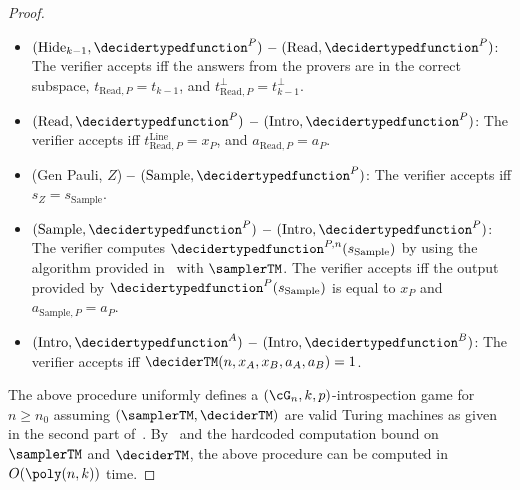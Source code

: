 \begin{proof}
\begin{itemize}
\begin{align*}
		\end{align*}
		and use a similar computation step to compute the description for $\ker{\left(\decidertypedfunction^{P, n}_{i+1,t_{< i +1}^{\text{Line}} }\right)}$ and $\ker{\left(\decidertypedfunction^{P, n}_{i+1,t_{< i +1}^{\text{Line}} }\right)}^{\bot}$. Then the verifier parse
		\begin{align*}
			r_{> i } &= 	\bar{r}_{i} + \bar{r}_{i}^{\bot} + \bar{r}_{>i+1} \in \ker{\left(\decidertypedfunction^{P, n}_{i+1,t_{< i +1}^{\text{Line}} }\right)} \oplus  \ker{\left(\decidertypedfunction^{P,n}_{i+1,t_{< i +1}^{\text{Line}} }\right)}^{\bot}  \oplus V_{> i+1}^n, 
		\end{align*}
		The verifier accepts iff the answers from the provers are in the correct subspace 
		\begin{align*}
			\tilde{t}_{\leq i }^{\bot} = t_{\leq i }^{\bot},\quad  \bar{r}_{i}^{\bot} = \tilde{t}_{i +1 }^{\bot}, \quad \tilde{t}_{< i }^{\text{Line}} = \tilde{t}_{< i }^{\text{Line}}, \quad \bar{r}_{>i+1} = r_{>i+1}.
		\end{align*} 
		\item $(\text{Hide}_{k-1}, \decidertypedfunction^{P})$ \textbf{--}   $(\text{Read},  \decidertypedfunction^{P})$: The verifier accepts iff the answers from the provers are in the correct subspace, $t_{\text{Read}, P} = t_{k-1}$, and $t_{\text{Read}, P}^{\bot} = t_{k-1}^{\bot}$.
		\item  $(\text{Read},  \decidertypedfunction^{P})$ \textbf{--}  $(\text{Intro},  \decidertypedfunction^{P})$: The verifier accepts iff $t_{\text{Read}, P}^{\text{Line}} = x_P$, and $a_{\text{Read}, P} = a_P$.
		\item (Gen Pauli, $Z$) \textbf{--} $(\text{Sample}, \decidertypedfunction^{P})$: The verifier accepts iff $s_Z = s_{\text{Sample}}$. 
		\item $(\text{Sample}, \decidertypedfunction^{P})$ \textbf{--} $(\text{Intro},  \decidertypedfunction^{P})$: The verifier computes $\decidertypedfunction^{P, n}(s_{\text{Sample}})$ by using the algorithm provided in~ with $\samplerTM$. The verifier accepts iff the output provided by $\decidertypedfunction^{P}(s_{\text{Sample}})$ is equal to $x_P$ and  $a_{\text{Sample}, P} = a_P$.
		\item $(\text{Intro},  \decidertypedfunction^{A})$   \textbf{--}  $(\text{Intro},  \decidertypedfunction^{B})$: The verifier accepts iff $\deciderTM(n, x_A,x_B,a_A, a_B) = 1$. 
	\end{itemize}
	The above procedure uniformly defines a $(\cG_n, k, p)$-introspection game for $n \geq n_0$ assuming $(\samplerTM, \deciderTM)$ are valid Turing machines as given in the second part of~.  By~ and the hardcoded computation bound on $\samplerTM$ and $\deciderTM$, the above procedure can be computed in $O(\poly(n,k))$ time. 
	

\end{proof}
